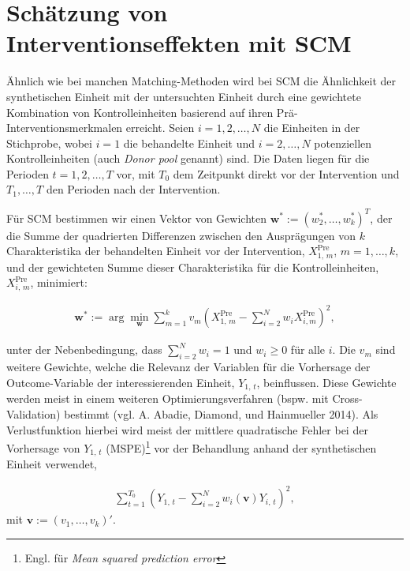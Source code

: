 \documentclass[
  a4paper,
  DIV=11,
  oneside]{scrreprt}
\begin{document}
\section{Schätzung von Interventionseffekten mit SCM}\label{sec-siscm}

Ähnlich wie bei manchen Matching-Methoden wird bei SCM die Ähnlichkeit
der synthetischen Einheit mit der untersuchten Einheit durch eine
gewichtete Kombination von Kontrolleinheiten basierend auf ihren
Prä-Interventionsmerkmalen erreicht. Seien \(i = 1, 2, \ldots, N\) die
Einheiten in der Stichprobe, wobei \(i = 1\) die behandelte Einheit und
\(i = 2, \ldots, N\) potenziellen Kontrolleinheiten (auch \emph{Donor
pool} genannt) sind. Die Daten liegen für die Perioden
\(t = 1, 2, \ldots, T\) vor, mit \(T_0\) dem Zeitpunkt direkt vor der
Intervention und \(T_1, \ldots, T\) den Perioden nach der Intervention.

Für SCM bestimmen wir einen Vektor von Gewichten
\(\mathbf{w}^* := (w_2^*, \ldots, w_k^*)^T\), der die Summe der
quadrierten Differenzen zwischen den Ausprägungen von \(k\)
Charakteristika der behandelten Einheit vor der Intervention,
\(X_{1,\,m}^{\text{Pre}}\), \(m=1,\dots,k\), und der gewichteten Summe
dieser Charakteristika für die Kontrolleinheiten,
\(X_{i,\,m}^{\text{Pre}}\), minimiert:

\begin{align}
  \mathbf{w}^* := \arg\min_{\mathbf{w}} \sum_{m=1}^{k} v_m \left( X_{1,\,m}^{\text{Pre}} - \sum_{i=2}^{N} w_i X_{i,m}^{\text{Pre}} \right)^2,\label{eq:scopt}
\end{align}

unter der Nebenbedingung, dass \(\sum_{i=2}^{N} w_i = 1\) und
\(w_i \geq 0\) für alle \(i\). Die \(v_m\) sind weitere Gewichte, welche
die Relevanz der Variablen für die Vorhersage der Outcome-Variable der
interessierenden Einheit, \(Y_{1,\,t}\), beinflussen. Diese Gewichte
werden meist in einem weiteren Optimierungsverfahren (bspw. mit
Cross-Validation) bestimmt (vgl. A. Abadie, Diamond, und Hainmueller
2014). Als Verlustfunktion hierbei wird meist der mittlere quadratische
Fehler bei der Vorhersage von \(Y_{1,\,t}\) (MSPE)\footnote{Engl. für
  \emph{Mean squared prediction error}} vor der Behandlung anhand der
synthetischen Einheit verwendet,

\begin{align}
  \sum_{t=1}^{T_0} \left( Y_{1,\,t} - \sum_{i=2}^N w_i(\mathbf{v}) Y_{i,\,t} \right)^2, \label{eq:scopt2}
\end{align} mit \(\mathbf{v} := (v_1,\dots,v_k)'\).
\end{document}
